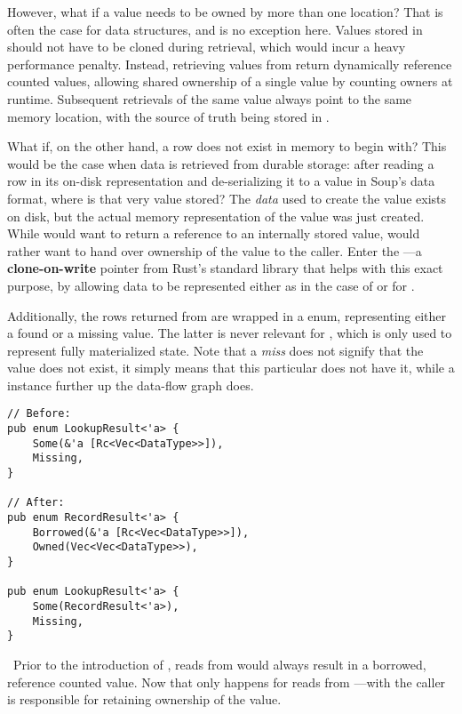 However, what if a value needs to be owned by more than one location? That is
often the case for data structures, and  is no exception here.
Values stored in  should not have to be cloned during
retrieval, which would incur a heavy performance penalty. Instead, retrieving
values from  return dynamically reference
counted values,
allowing shared ownership of a single value by counting owners at runtime.
Subsequent retrievals of the same value always point to the same memory
location, with the source of truth being stored in .


What if, on the other hand, a row does not exist in memory to begin with? This
would be the case when data is retrieved from durable storage: after reading a
row in its on-disk representation and de-serializing it to a value in Soup's
data format, where is that very value stored? The \textit{data} used to create
the value exists on disk, but the actual memory representation of the value was
just created. While  would want to return a reference
to an internally stored value,  would rather want
to hand over ownership of the value to the caller. Enter the
---a \textbf{clone-on-write} pointer from Rust's standard library that helps
with this exact purpose, by allowing data to be represented either as
 in the case of  or  for
.

Additionally, the rows returned from  are wrapped in a
 enum, representing either a found or a missing value. The
latter is never relevant for , which is only used to
represent fully materialized state. Note that a \textit{miss} does not signify
that the value does not exist, it simply means that this particular 
does not have it, while a  instance further up the data-flow graph
does.

\begin{listing}[H]
  \begin{verbatim}
// Before:
pub enum LookupResult<'a> {
    Some(&'a [Rc<Vec<DataType>>]),
    Missing,
}

// After:
pub enum RecordResult<'a> {
    Borrowed(&'a [Rc<Vec<DataType>>]),
    Owned(Vec<Vec<DataType>>),
}

pub enum LookupResult<'a> {
    Some(RecordResult<'a>),
    Missing,
}
  \end{verbatim}
  \caption{\
    Prior to the introduction of , reads from 
    would always result in a borrowed, reference counted value. Now that only
    happens for reads from \code{MemoryState}---with \code{PersistentState} the
    caller is responsible for retaining ownership of the value.
  }\label{lst:existing-index}
\end{listing}

